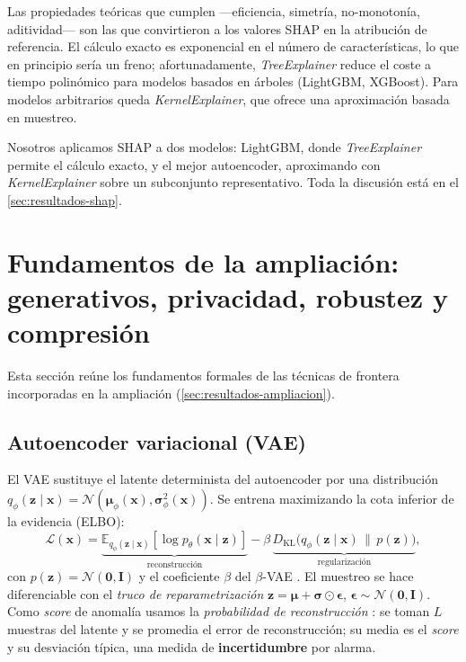 Las propiedades teóricas que cumplen ---eficiencia, simetría, no-monotonía, aditividad--- son las que convirtieron a los valores SHAP en la atribución de referencia. El cálculo exacto es exponencial en el número de características, lo que en principio sería un freno; afortunadamente, \textit{TreeExplainer} \cite{lundberg2020fromlocal} reduce el coste a tiempo polinómico para modelos basados en árboles (LightGBM, XGBoost). Para modelos arbitrarios queda \textit{KernelExplainer}, que ofrece una aproximación basada en muestreo.

Nosotros aplicamos SHAP a dos modelos: LightGBM, donde \textit{TreeExplainer} permite el cálculo exacto, y el mejor autoencoder, aproximando con \textit{KernelExplainer} sobre un subconjunto representativo. Toda la discusión está en el \cref{sec:resultados-shap}.

\section{Fundamentos de la ampliación: generativos, privacidad, robustez y compresión}
\label{sec:teo-ampliacion}

Esta sección reúne los fundamentos formales de las técnicas de frontera incorporadas en la ampliación (\cref{sec:resultados-ampliacion}).

\subsection{Autoencoder variacional (VAE)}
\label{sec:teo-vae}
El VAE \cite{kingma2014vae} sustituye el latente determinista del autoencoder por una distribución $q_\phi(\bm z\mid\bm x)=\mathcal N(\bm\mu_\phi(\bm x),\bm\sigma^2_\phi(\bm x))$. Se entrena maximizando la cota inferior de la evidencia (ELBO):
\begin{equation}
\mathcal L(\bm x)=\underbrace{\mathbb E_{q_\phi(\bm z\mid\bm x)}[\log p_\theta(\bm x\mid\bm z)]}_{\text{reconstrucción}}-\beta\,\underbrace{D_{\mathrm{KL}}\!\big(q_\phi(\bm z\mid\bm x)\,\|\,p(\bm z)\big)}_{\text{regularización}},
\label{eq:elbo}
\end{equation}
con $p(\bm z)=\mathcal N(\bm 0,\bm I)$ y el coeficiente $\beta$ del $\beta$-VAE \cite{higgins2017betavae}. El muestreo se hace diferenciable con el \emph{truco de reparametrización} $\bm z=\bm\mu+\bm\sigma\odot\bm\epsilon$, $\bm\epsilon\sim\mathcal N(\bm 0,\bm I)$. Como \textit{score} de anomalía usamos la \emph{probabilidad de reconstrucción} \cite{an2015reconstruction}: se toman $L$ muestras del latente y se promedia el error de reconstrucción; su media es el \textit{score} y su desviación típica, una medida de \textbf{incertidumbre} por alarma.

